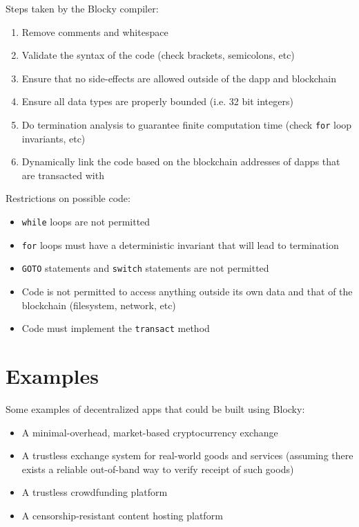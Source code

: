 \documentclass[letterpaper]{article}
\begin{document}
Steps taken by the Blocky compiler:
\begin{enumerate}
  \item{Remove comments and whitespace}
  \item{Validate the syntax of the code (check brackets, semicolons, etc)}
  \item{Ensure that no side-effects are allowed outside of the dapp and blockchain}
  \item{Ensure all data types are properly bounded (i.e. 32 bit integers)}
  \item{Do termination analysis to guarantee finite computation time (check \texttt{for} loop invariants, etc)}
  \item{Dynamically link the code based on the blockchain addresses of dapps that are transacted with}
\end{enumerate}

Restrictions on possible code:
\begin{itemize}
  \item{\texttt{while} loops are not permitted}
  \item{\texttt{for} loops must have a deterministic invariant that will lead to termination}
  \item{\texttt{GOTO} statements and \texttt{switch} statements are not permitted}
  \item{Code is not permitted to access anything outside its own data and that of the blockchain (filesystem, network, etc)}
  \item{Code must implement the \texttt{transact} method}
\end{itemize}

\section{Examples}

Some examples of decentralized apps that could be built using Blocky:
\begin{itemize}
  \item{A minimal-overhead, market-based cryptocurrency exchange}
  \item{A trustless exchange system for real-world goods and services (assuming there exists a reliable out-of-band way to verify receipt of such goods)}
  \item{A trustless crowdfunding platform}
  \item{A censorship-resistant content hosting platform}
\end{itemize}
\end{document}
